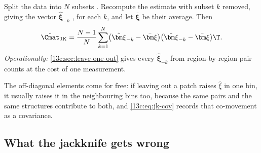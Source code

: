 \begin{workdef}
Split the data into $N$ subsets . Recompute the estimate with subset $k$ removed, giving the vector
$\hat{\bm\xi}_{-k}$ , for
each $k$, and let $\bar{\bm\xi}$ be their average. Then
\begin{equation}
  \hat\Cmat_{\mathrm{JK}}=\frac{N-1}{N}\sum_{k=1}^N
  \bigl(\hat{\bm\xi}_{-k}-\bar{\bm\xi}\bigr)\bigl(\hat{\bm\xi}_{-k}-\bar{\bm\xi}\bigr)\T .
  \label{13c:eq:jk-cov}
\end{equation}
\emph{Operationally:} \cref{13c:sec:leave-one-out} gives every
$\hat{\bm\xi}_{-k}$ from region-by-region pair counts at the cost of one
measurement.
\end{workdef}

The off-diagonal elements come for free: if leaving out a patch raises $\hat\xi$ in
one bin, it usually raises it in the neighbouring bins too, because the same pairs
and the same structures contribute to both, and \eqref{13c:eq:jk-cov} records that
co-movement as a covariance.

\subsection{What the jackknife gets wrong}
\label{13c:sec:jk-bias}

